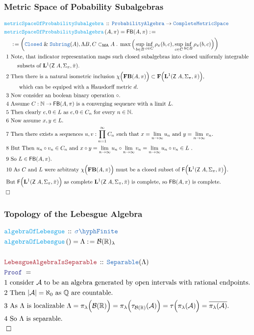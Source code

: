\documentclass[12pt]{scrartcl}
\newcommand{\TYPE}[1]{\textcolor{NavyBlue}{\mathtt{#1}}}
\newcommand{\FUNC}[1]{\textcolor{Cerulean}{\mathtt{#1}}}
\newcommand{\LOGIC}[1]{\textcolor{Blue}{\mathtt{#1}}}
\newcommand{\THM}[1]{\textcolor{Maroon}{\mathtt{#1}}}
\renewcommand{\.}{\; . \;}
\newcommand{\de}{: \kern 0.1pc =}
\newcommand{\Act}[1]{\left( #1 \right)}
\newcommand{\Theorem}[2]{& \THM{#1} \, :: \, #2 \\ & \Proof = \\ }
\newcommand{\DeclareFunc}[2]{& \FUNC{#1} \, :: \, #2 \\}
\newcommand{\DefineNamedFunc}[4]{&  \FUNC{#1}\Act{#2} = #3 \de #4 \\}
\newcommand{\NewLine}{\\ & \kern 1pc}
\newcommand{\Page}[1]{ \begin{align*} #1 \end{align*}   }
\renewcommand{\And}{\; \& \;}
\newcommand{\Reals}{\mathbb{R} }
\newcommand{\Rats}{\mathbb{Q} }
\newcommand{\Nat}{\mathbb{N} }
\newcommand{\QED}{\; \square}
\newcommand{\EndProof}{& \QED \\}
\newcommand{\Proof}{\LOGIC{Proof} \; }
\newcommand{\Explain}[1]{& \text{#1.} \\}
\newcommand{\ExplainFurther}[1]{& \text{#1} \\}
\newcommand{\A}{\mathcal{A}}
\newcommand{\B}{\mathcal{B}}
\newcommand{\Z}{\mathsf{Z}}
\newcommand{\Closed}{\TYPE{Closed}}
\newcommand{\Complete}{\TYPE{Complete}}
\newcommand{\sFinite}{\TYPE{\sigma \hyph  Finite}}
\newcommand{\Lp}[1]{\mathbf{L}^{#1}}
\newcommand{\ma}{\mathsf{MA}}
\begin{document}
\subsubsection{Metric Space of Pobability Subalgebras}
\Page{
	\DeclareFunc{metricSpaceOfProbabilitySubalgebra}
	{
		\TYPE{ProbabilityAlgebra} \to \Complete\TYPE{MetricSpace}
	}
	\DefineNamedFunc{metricSpaceOfProbabilitySubalgebra}{A,\pi}
	{ \mathsf{FB}(A,\pi)}
	{
		\NewLine \de
		\left(  
			\Closed \And \TYPE{Subring}(A),
			\Lambda B,C \subset_{\ma} A \.
			\max\Big( \sup_{b \in B} \inf_{c \in C} \rho_\pi(b,c),
			 \sup_{c \in C} \inf_{b \in B} \rho_\pi(b,c) \Big)
		\right)	
	}
	\ExplainFurther{ 1 Note, that indicator representation maps such closed subalgebras into  
		closed uniformly integrable } 
	\Explain{$\quad\quad$ subsets of $\Lp{1}(\Z\;A,\Sigma_\pi,\bar \pi)$}
	\ExplainFurther{ 2 Then there is a natural isometric inclusion 
		$\chi\Big(\mathbf{FB}(A,\pi)\Big) \subset \mathbf{F}\Big( \Lp{1}(\Z\;A,\Sigma_\pi,\bar \pi) \Big)$,}
	\Explain{ $\quad\quad$  which can be equiped with a Hausdorff metric $d$}
	\Explain{ 3 Now consider an boolean binary operation $\circ$}
	\Explain{ 4 Assume $C : \Nat \to \mathsf{FB}(A,\pi)$  is a converging sequence with a limit $L$}
	\Explain{ 5 Then clearly $e,0 \in L$ as $e,0 \in C_n$ for every $n \in \Nat$}
	\Explain{ 6 Now assume $x,y \in L$}
	\Explain{ 7 Then there exists a sequences $u,v : \prod^\infty_{n=1} C_n$
		such that $x = \lim_{n \to \infty} u_n$ and $y = \lim_{n \to \infty}  v_n$}
	\Explain{ 8 But Then $u_n \circ v_n \in C_n$ and $x \circ y = 
		\lim_{n \to \infty} u_n \circ \lim_{n \to \infty} v_n = \lim_{n \to \infty} u_n \circ v_n \in L$  }
	\Explain{ 9 So $L \in \mathsf{FB}(A,\pi)$}
	\Explain{ 10 As $C$ and $L$ were arbitraty $\chi\Big(\mathbf{FB}(A,\pi)\Big)$
		must be a closed subset of $\mathsf{F}\Big(\Lp{1}(\Z\;A,\Sigma_\pi,\bar \pi)\Big)$}	
	\Explain{ But $\mathsf{F}\Big(\Lp{1}(\Z\;A,\Sigma_\pi,\bar \pi)\Big)$ 
		as complete $\Lp{1}(\Z\;A,\Sigma_\pi,\bar \pi)$ is complete, so 
		$\mathsf{FB}(A,\pi)$ is complete}
	\EndProof
}
\newpage
\subsubsection{Topology of the Lebesgue Algebra}
\Page{
	\DeclareFunc{algebraOfLebesgue}{\sFinite}
	\DefineNamedFunc{algebraOfLebesgue}{}{\Lambda}{\B(\Reals)_\lambda}
	\\
	\Theorem{LebesgueAlgebraIsSeparable}
	{
		\TYPE{Separable}(\Lambda)
	}
	\Explain{1 consider $\A$ to be an algebra generated by open intervals with rational endpoints}
	\Explain{2 Then $|\A| = \aleph_0$ as $\Rats$ are countable}
	\Explain{3 As $\Lambda$ is localizable 
		$\Lambda = \pi_\lambda\Big( \B(\Reals)\Big) = \pi_\lambda\Big( \tau_{\B(\Reals)}(\A) \Big) 
		= \tau\Big( \pi_\lambda(\A) \Big) = \overline{\pi_\lambda(\A)}$}
	\Explain{4 So $\Lambda$ is separable}
	\EndProof
}
\newpage
\end{document}
